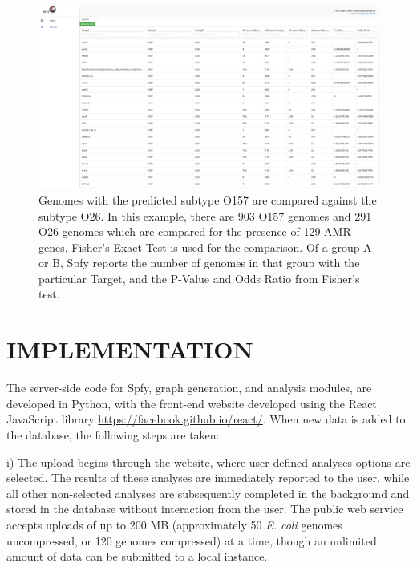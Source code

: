 \documentclass{article}
\begin{document}
\begin{figure}[!hb]
\begin{center}
\includegraphics[width=\textwidth]{images/o157vo26_amrgenes}
\end{center}
\caption{
Genomes with the predicted subtype O157 are compared against the subtype O26. In this example, there are 903 O157 genomes and 291 O26 genomes which are compared for the presence of 129 AMR genes. Fisher's Exact Test is used for the comparison. Of a group A or B, Spfy reports the  number of genomes in that group with the particular Target, and the P-Value and Odds Ratio from Fisher's test.}
\label{fig-groupings}
\end{figure}

\section{IMPLEMENTATION}
The server-side code for Spfy, graph generation, and analysis modules, are developed in Python, with the front-end website developed using the React JavaScript library \url{https://facebook.github.io/react/}. When new data is added to the database, the following steps are taken:

i) The upload begins through the website, where user-defined analyses options are selected. The results of these analyses are immediately reported to the user, while all other non-selected analyses are subsequently completed in the background and stored in the database without interaction from the user. The public web service accepts uploads of up to 200 MB (approximately 50 \textit {E. coli} genomes uncompressed, or 120 genomes compressed) at a time, though an unlimited amount of data can be submitted to a local instance.
\end{document}
